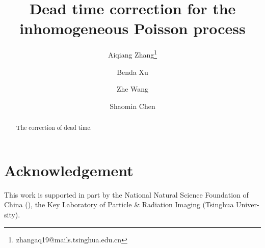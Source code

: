 \documentclass[a4paper,10pt]{article}
\begin{document}
    \title{Dead time correction for the inhomogeneous Poisson process}

    \author[a,b,c]{Aiqiang Zhang\thanks{zhangaq19@mails.tsinghua.edu.cn}}%
    

    \author[a,b,c]{Benda Xu}%
    \author[a,b,c]{Zhe Wang}
    \author[a,b,c]{Shaomin Chen}

\maketitle
\def\dif{\mathop{}\!\mathrm{d}}

\begin{abstract}
The correction of dead time.
\end{abstract}
\linenumbers




\section{Acknowledgement}
This work is supported in part by the National Natural Science Foundation of China
(), the Key Laboratory of Particle \& Radiation Imaging (Tsinghua Univer-
sity).
\printbibliography
\appendix

\end{document}
